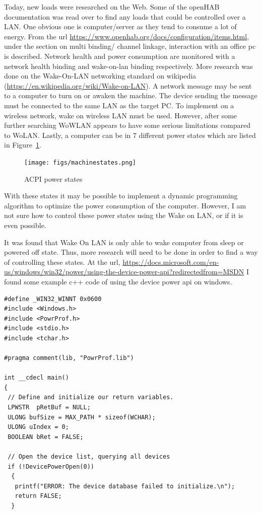 \documentclass[fontsize=11pt, %
                             paper=letter, %
                             twoside, %
                             captions=tableheading,
                             index=totoc,
                             hyperref]{labbook}
\begin{document}
\begin{addmargin}[0cm]{0cm}
Today, new loads were researched on the Web. Some of the openHAB documentation was read over to find any loads that could be controlled over a LAN. One obvious one is computer/server as they tend to consume a lot of energy. From the url \url{https://www.openhab.org/docs/configuration/items.html}, under the section on multi binding/ channel linkage, interaction with an office pc is described. Network health and power consumption are monitored with a network health binding and wake-on-lan binding respectively.
\smallbreak\noindent
More research was done on the Wake-On-LAN networking standard on wikipedia (\url{https://en.wikipedia.org/wiki/Wake-on-LAN}). A network message may be sent to a computer to turn on or awaken the machine. The device sending the message must be connected to the same LAN as the target PC. To implement on a wireless network, wake on wireless LAN must be used. However, after some further searching WoWLAN appears to have some serious limitations compared to WoLAN. Lastly, a computer can be in 7 different power states which are listed in Figure~\ref{figs:powerstates}.
\begin{figure}[H]
\centering
\texttt{[image: figs/machinestates.png]}
\caption{ACPI power states}
\label{figs:powerstates}
\end{figure} 
With these states it may be possible to implement a dynamic programming algorithm to optimize the power consumption of the computer. However, I am not sure how to control these power states using the Wake on LAN, or if it is even possible.

It was found that Wake On LAN is only able to wake computer from sleep or powered off state. Thus, more research will need to be done in order to find a way of controlling these states. At the url, \url{https://docs.microsoft.com/en-us/windows/win32/power/using-the-device-power-api?redirectedfrom=MSDN} I found some example c++ code of using the device power api on windows.

\begin{Verbatim}[tabsize=4]
#define _WIN32_WINNT 0x0600
#include <Windows.h>
#include <PowrProf.h>
#include <stdio.h>
#include <tchar.h>

#pragma comment(lib, "PowrProf.lib")

int __cdecl main()
{
 // Define and initialize our return variables.
 LPWSTR  pRetBuf = NULL;
 ULONG bufSize = MAX_PATH * sizeof(WCHAR);
 ULONG uIndex = 0;
 BOOLEAN bRet = FALSE;

 // Open the device list, querying all devices
 if (!DevicePowerOpen(0)) 
  {
   printf("ERROR: The device database failed to initialize.\n");
   return FALSE;
  }


\end{Verbatim}
\end{addmargin}
\end{document}
